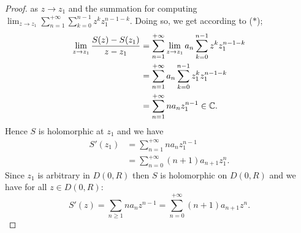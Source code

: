 \begin{proof}
as $z \rightarrow z_1 $ and the summation for computing \\
$\lim_{z \to z_1} \sum_{n=1}^{+\infty } 
\sum_{k=0}^{n-1} z^k z_1^{n-1-k}$. Doing so, we get 
according to ($*$);
\begin{align*}
\lim_{z \to z_1} 
\frac{S(z) - S(z_1) }{z - z_1} &= 
\sum_{n=1}^{+\infty } \lim_{z \to z_1} a_n 
\sum_{k=0}^{n-1} z^k z_1^{n-1-k} \\
                               &= 
                               \sum_{n=1}^{+\infty } a_n 
                               \sum_{k=0}^{n-1} z_1^k z_1^{n-1-k} \\
                               &=
                               \sum_{n=1}^{+\infty } n a_n z_1^{n-1} \in  \mathbb{C} .
\end{align*}
Hence $S $ is holomorphic at $z_1 $ and we have
\begin{align*}
S'(z_1)  &= 
\sum_{n=1}^{+\infty } 
n a_n z_1^{n-1} \\
         &= 
         \sum_{n=0}^{+\infty} (n+1) a_{n+1}z_1^n.
\end{align*}
Since $z_1 $ is arbitrary in $D(0, R)  $ then $S $ is holomorphic 
on $D(0, R)  $ and we have for all $z \in   D(0, R) : $ 
\[
S'(z)  = 
\sum_{n \geq 1}^{} n 
a_n z^{n-1} = \sum_{n=0}^{+\infty} (n+1) a_{n+1}z^n .
\]
\end{proof}
